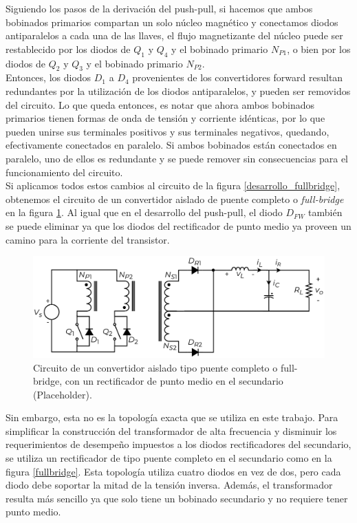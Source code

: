 Siguiendo los pasos de la derivación del push-pull, si hacemos que ambos bobinados primarios compartan un solo núcleo magnético y conectamos diodos antiparalelos a cada una de las llaves, el flujo magnetizante del núcleo puede ser restablecido por los diodos de $Q_1$ y $Q_4$ y el bobinado primario $N_{P1}$, o bien por los diodos de $Q_2$ y $Q_3$ y el bobinado primario $N_{P2}$.\\

Entonces, los diodos $D_1$ a $D_4$ provenientes de los convertidores forward resultan redundantes por la utilización de los diodos antiparalelos, y pueden ser removidos del circuito. Lo que queda entonces, es notar que ahora ambos bobinados primarios tienen formas de onda de tensión y corriente idénticas, por lo que pueden unirse sus terminales positivos y sus terminales negativos, quedando, efectivamente conectados en paralelo. Si ambos bobinados están conectados en paralelo, uno de ellos es redundante y se puede remover sin consecuencias para el funcionamiento del circuito.\\

Si aplicamos todos estos cambios al circuito de la figura \ref{desarrollo_fullbridge}, obtenemos el circuito de un {\Medium convertidor aislado de puente completo} o {\Medium \textit{full-bridge}} en la figura \ref{fullbridge_partido}. Al igual que en el desarrollo del push-pull, el diodo $D_{FW}$ también se puede eliminar ya que los diodos del rectificador de punto medio ya proveen un camino para la corriente del transistor.\\

\begin{figure}[H]
    \centering
    \includegraphics[scale=0.6]{Imagenes/Push-Pull.pdf}
    \caption{Circuito de un convertidor aislado tipo puente completo o full-bridge, con un rectificador de punto medio en el secundario (Placeholder).}
    \label{fullbridge_partido}
\end{figure}

Sin embargo, esta no es la topología exacta que se utiliza en este trabajo. Para simplificar la construcción del transformador de alta frecuencia y disminuir los requerimientos de desempeño impuestos a los diodos rectificadores del secundario, se utiliza un {\Medium rectificador de tipo puente completo} en el secundario como en la figura \ref{fullbridge}. Esta topología utiliza cuatro diodos en vez de dos, pero cada diodo debe soportar la mitad de la tensión inversa. Además, el transformador resulta más sencillo ya que solo tiene un bobinado secundario y no requiere tener punto medio.\\

